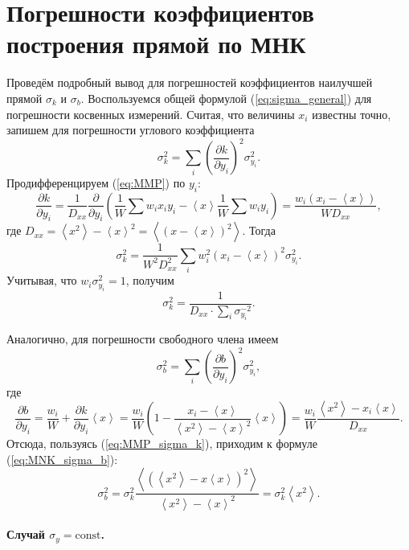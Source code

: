 \section{Погрешности коэффициентов построения прямой по МНК}

Проведём подробный вывод для погрешностей коэффициентов наилучшей
прямой $\sigma_{k}$ и $\sigma_{b}$. Воспользуемся общей формулой
(\ref{eq:sigma_general}) для погрешности косвенных измерений. Считая,
что величины $x_{i}$ известны точно, запишем для погрешности углового
коэффициента
\[
\sigma_{k}^{2}=\sum\limits _{i}\left(\frac{\partial k}{\partial y_{i}}\right)^{2}\sigma_{y_{i}}^{2}.
\]
Продифференцируем (\ref{eq:MMP}) по $y_{i}$:
\[
\frac{\partial k}{\partial y_{i}}=\frac{1}{D_{xx}}\frac{\partial}{\partial y_{i}}\left(\frac{1}{W}\sum w_{i}x_{i}y_{i}-\left\langle x\right\rangle \frac{1}{W}\sum w_{i}y_{i}\right)=\frac{w_{i}\left(x_{i}-\left\langle x\right\rangle \right)}{WD_{xx}},
\]
где $D_{xx}=\left\langle x^{2}\right\rangle -\left\langle x\right\rangle ^{2}=\left\langle (x-\left\langle x\right\rangle )^{2}\right\rangle $.
Тогда
\[
\sigma_{k}^{2}=\frac{1}{W^{2}D_{xx}^{2}}\sum\limits _{i}w_{i}^{2}\left(x_{i}-\left\langle x\right\rangle \right)^{2}\sigma_{y_{i}}^{2}.
\]
Учитывая, что $w_{i}\sigma_{y_{i}}^{2}=1$, получим
\begin{equation}
\boxed{\sigma_{k}^{2}=\frac{1}{D_{xx}\cdot\sum\limits _{i}\sigma_{y_{i}}^{-2}}}.\label{eq:MMP_sigma_k}
\end{equation}

Аналогично, для погрешности свободного члена имеем
\[
\sigma_{b}^{2}=\sum_{i}\left(\frac{\partial b}{\partial y_{i}}\right)^{2}\sigma_{y_{i}}^{2},
\]
где 
\[
\frac{\partial b}{\partial y_{i}}=\frac{w_{i}}{W}+\frac{\partial k}{\partial y_{i}}\left\langle x\right\rangle =\frac{w_{i}}{W}\left(1-\frac{x_{i}-\left\langle x\right\rangle }{\left\langle x^{2}\right\rangle -\left\langle x\right\rangle ^{2}}\left\langle x\right\rangle \right)=\frac{w_{i}}{W}\frac{\left\langle x^{2}\right\rangle -x_{i}\left\langle x\right\rangle }{D_{xx}}.
\]
Отсюда, пользуясь (\ref{eq:MMP_sigma_k}), приходим к формуле (\ref{eq:MNK_sigma_b}):
\[
\sigma_{b}^{2}=\sigma_{k}^{2}\frac{\left\langle \left(\left\langle x^{2}\right\rangle -x\left\langle x\right\rangle \right)^{2}\right\rangle }{\left\langle x^{2}\right\rangle -\left\langle x\right\rangle ^{2}}=\sigma_{k}^{2}\left\langle x^{2}\right\rangle .
\]

\paragraph{Случай $\sigma_{y}=\mathrm{const}$.}

